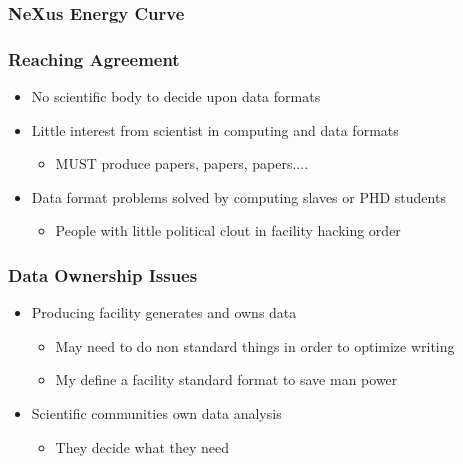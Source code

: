\documentclass{beamer}
\begin{document}
\begin{frame} \frametitle{NeXus Energy Curve}
\begin{figure}[!ht]
\end{figure}
\end{frame}

\begin{frame}
\frametitle{Reaching Agreement}
\begin{itemize}
\item No scientific body to decide upon data formats
\item Little interest from scientist in computing and data formats
\begin{itemize}
\item MUST produce papers, papers, papers....
\end{itemize}
\item Data format problems solved by computing slaves or PHD students
\begin{itemize}
\item People with little political clout in facility hacking order
\end{itemize}
\end{itemize}
\end{frame}


\begin{frame}
\frametitle{Data Ownership Issues}
\begin{itemize}
\item Producing facility generates and owns data
\begin{itemize}
\item May need to do non standard things in order to optimize writing
\item My define a facility standard format to save man power
\end{itemize}
\item Scientific communities own data analysis
\begin{itemize}
\item They decide what they need
\end{itemize}
\end{itemize}
\end{frame}
\end{document}

